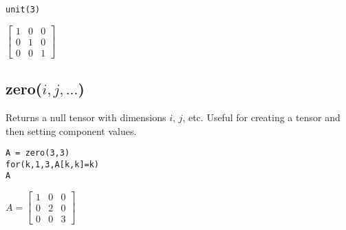 {\color{blue}
\begin{verbatim}
unit(3)
\end{verbatim}
}

\noindent
$\displaystyle
\begin{bmatrix}
1 & 0 & 0\\
0 & 1 & 0\\
0 & 0 & 1
\end{bmatrix}
$

\subsection*{zero($i,j,\ldots$)}

Returns a null tensor with dimensions $i$, $j$, etc.
Useful for creating a tensor and then setting component values.

{\color{blue}
\begin{verbatim}
A = zero(3,3)
for(k,1,3,A[k,k]=k)
A
\end{verbatim}
}

\noindent
$\displaystyle
A=
\begin{bmatrix}
1 & 0 & 0\\
0 & 2 & 0\\
0 & 0 & 3
\end{bmatrix}
$
